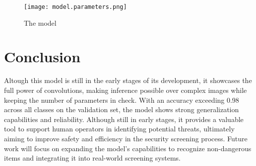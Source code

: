 \documentclass[twocolumn, fontsize=10pt]{article}
\begin{document}
\begin{figure}[htb]
\centering
\texttt{[image: model.parameters.png]}
\caption{The model}
\end{figure}

\section{Conclusion}
Altough this model is still in the early stages of its development, it showcases the full power of convolutions, making inference possible over complex images while keeping the number of parameters in check. With an accuracy exceeding 0.98 across all classes on the validation set, the model shows strong generalization capabilities and reliability. Although still in early stages, it provides a valuable tool to support human operators in identifying potential threats, ultimately aiming to improve safety and efficiency in the security screening process. Future work will focus on expanding the model’s capabilities to recognize non-dangerous items and integrating it into real-world screening systems.




 
\end{document}
